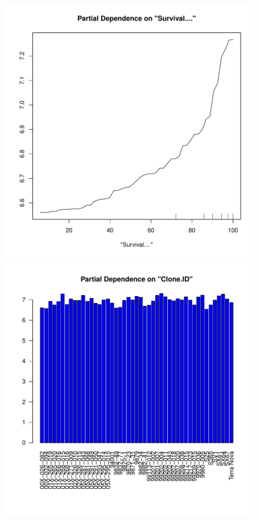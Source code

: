 \documentclass{article}\usepackage[]{graphicx}\usepackage[]{color}
\makeatletter
\def\maxwidth{ %
  \ifdim\Gin@nat@width>\linewidth
    \linewidth
  \else
    \Gin@nat@width
  \fi
}
\newenvironment{knitrout}{}{} %
\makeatother
\begin{document}
\begin{knitrout}
{}




{\centering \includegraphics[width=\maxwidth]{figure/PartialDependence-3} 

}




{\centering \includegraphics[width=\maxwidth]{figure/PartialDependence-4} 

}
\end{knitrout}
\end{document}
